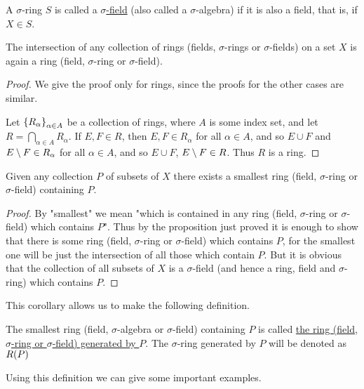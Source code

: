 \begin{definition}
A $\sigma$-ring $S$ is called a \underline{$\sigma$-field} (also called a $\sigma$-algebra) if it is also a field, that is, if $X\in S$.
\end{definition}

\begin{proposition}
The intersection of any collection of rings (fields, $\sigma$-rings or $\sigma$-fields) on a set $X$ is again a ring (field, $\sigma$-ring or $\sigma$-field).
\end{proposition}
\begin{proof}
We give the proof only for rings, since the proofs for the other cases are similar.

Let $\left\{R_\alpha\right\}_{\alpha\in A}$ be a collection of rings, where $A$ is some index set, and let $R = \bigcap_{\alpha\in A}R_\alpha$. If $E,F\in R$, then $E,F\in R_\alpha$ for all $\alpha\in A$, and so $E\cup F$ and $E\setminus F\in R_\alpha$ for all $\alpha\in A$, and so $E\cup F$, $E\setminus F\in R$. Thus $R$ is a ring.
\end{proof}

\begin{corollary}
Given any collection $P$ of subsets of $X$ there exists a smallest ring (field, $\sigma$-ring or $\sigma$-field) containing $P$.
\end{corollary}
\begin{proof}
By "smallest" we mean "which is contained in any ring (field, $\sigma$-ring or $\sigma$-field) which contains $P$". Thus by the proposition just proved it is enough to show that there is some ring (field, $\sigma$-ring or $\sigma$-field) which contains $P$, for the smallest one will be just the intersection of all those which contain $P$. But it is obvious that the collection of all subsets of $X$ is a $\sigma$-field (and hence a ring, field and $\sigma$-ring) which contains $P$.
\end{proof}

This corollary allows us to make the following definition.

\begin{definition}
The smallest ring (field, $\sigma$-algebra or $\sigma$-field) containing $P$ is called \underline{the ring (field, $\sigma$-ring or $\sigma$-field) generated by $P$}. The $\sigma$-ring generated by $P$ will be denoted as $R(P)$
\end{definition}

Using this definition we can give some important examples.

